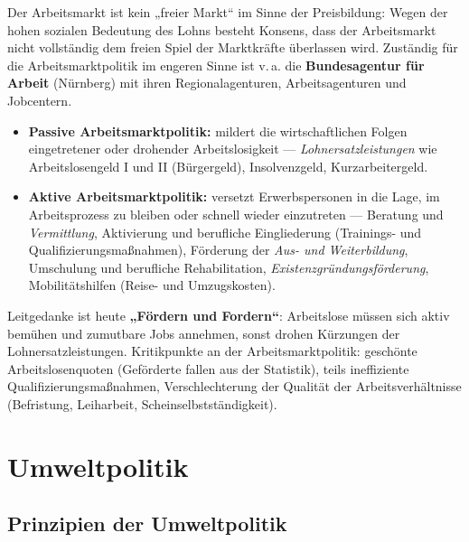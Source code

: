 \documentclass[11pt, a4paper]{article}
\begin{document}
Der Arbeitsmarkt ist kein „freier Markt`` im Sinne der Preisbildung: Wegen der hohen
sozialen Bedeutung des Lohns besteht Konsens, dass der Arbeitsmarkt nicht vollständig dem
freien Spiel der Marktkräfte überlassen wird. Zuständig für die Arbeitsmarktpolitik im
engeren Sinne ist v.\,a. die \textbf{Bundesagentur für Arbeit} (Nürnberg) mit ihren
Regionalagenturen, Arbeitsagenturen und Jobcentern.

\begin{itemize}
  \item \textbf{Passive Arbeitsmarktpolitik:} mildert die wirtschaftlichen Folgen
    eingetretener oder drohender Arbeitslosigkeit --- \emph{Lohnersatzleistungen} wie
    Arbeitslosengeld I und II (Bürgergeld), Insolvenzgeld, Kurzarbeitergeld.
  \item \textbf{Aktive Arbeitsmarktpolitik:} versetzt Erwerbspersonen in die Lage, im
    Arbeitsprozess zu bleiben oder schnell wieder einzutreten --- Beratung und
    \emph{Vermittlung}, Aktivierung und berufliche Eingliederung (Trainings- und
    Qualifizierungsmaßnahmen), Förderung der \emph{Aus- und Weiterbildung}, Umschulung und
    berufliche Rehabilitation, \emph{Existenzgründungsförderung}, Mobilitätshilfen (Reise-
    und Umzugskosten).
\end{itemize}

Leitgedanke ist heute \textbf{„Fördern und Fordern``}: Arbeitslose müssen sich aktiv
bemühen und zumutbare Jobs annehmen, sonst drohen Kürzungen der Lohnersatzleistungen.
Kritikpunkte an der Arbeitsmarktpolitik: geschönte Arbeitslosenquoten (Geförderte fallen
aus der Statistik), teils ineffiziente Qualifizierungsmaßnahmen, Verschlechterung der
Qualität der Arbeitsverhältnisse (Befristung, Leiharbeit, Scheinselbstständigkeit).

\section{Umweltpolitik}

\subsection{Prinzipien der Umweltpolitik}
\end{document}
